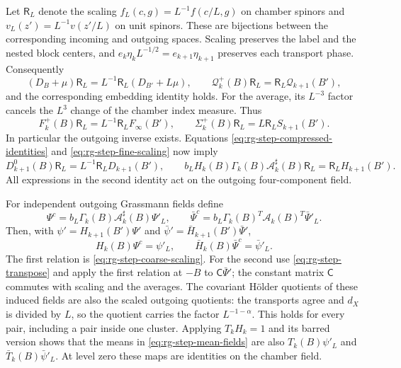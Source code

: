 Let $\mathsf R_L$ denote the scaling
$f_L(c,g)=L^{-1}f(c/L,g)$ on chamber spinors and
$v_L(z')=L^{-1}v(z'/L)$ on unit spinors.
These are bijections between the corresponding
incoming and outgoing spaces. Scaling preserves
the label and the nested block centers, and
$e_k\eta_kL^{-1/2}=e_{k+1}\eta_{k+1}$ preserves
each transport phase. Consequently
\[
 (D_B+\mu)\mathsf R_L
       =L^{-1}\mathsf R_L(D_{B'}+L\mu),\qquad
 \mathcal Q_k^+(B)\mathsf R_L
       =\mathsf R_L\mathcal Q_{k+1}(B'),
\]
and the corresponding embedding identity holds.
For the average, its $L^{-3}$ factor cancels the
$L^3$ change of the chamber index measure.
Thus
\begin{equation}\label{eq:rg-step-fine-scaling}
 F_k^+(B)\mathsf R_L
                   =L^{-1}\mathsf R_LF_\infty(B'),\qquad
 \Sigma_k^+(B)\mathsf R_L
                         =L\mathsf R_LS_{k+1}(B').
\end{equation}
In particular the outgoing inverse exists.
Equations \eqref{eq:rg-step-compressed-identities} and
\eqref{eq:rg-step-fine-scaling} now imply
\begin{equation}\label{eq:rg-step-coarse-scaling}
 D_{k+1}^0(B)\mathsf R_L
                       =L^{-1}\mathsf R_LD_{k+1}(B'),\qquad
 b_LH_k(B)\Gamma_k(B)\mathcal A_k^\sharp(B)\mathsf R_L
                       =\mathsf R_LH_{k+1}(B').
\end{equation}
All expressions in the second identity act on the
outgoing four-component field.

For independent outgoing Grassmann fields define
\begin{equation}\label{eq:rg-step-mean-fields}
 \Psi^c=b_L\Gamma_k(B)\mathcal A_k^\sharp(B)\Psi'_L,\qquad
 \bar\Psi^c=b_L\Gamma_k(B)^T\mathcal A_k(B)^T\bar\Psi'_L.
\end{equation}
Then, with $\psi'=H_{k+1}(B')\Psi'$ and
$\bar\psi'=\bar H_{k+1}(B')\bar\Psi'$,
\begin{equation}\label{eq:rg-step-induced-fields}
 H_k(B)\Psi^c=\psi'_L,\qquad
 \bar H_k(B)\bar\Psi^c=\bar\psi'_L.
\end{equation}
The first relation is \eqref{eq:rg-step-coarse-scaling}.
For the second use \eqref{eq:rg-step-transpose}
and apply the first relation at $-B$ to
$\mathsf C\bar\Psi'$; the constant matrix
$\mathsf C$ commutes with scaling and the averages.
The covariant H\"older quotients of these induced
fields are also the scaled outgoing quotients:
the transports agree and $d_X$ is divided by $L$,
so the quotient carries the factor $L^{-1-\alpha}$.
This holds for every pair, including a pair inside
one cluster.
Applying $T_kH_k=1$ and its barred version shows
that the means in \eqref{eq:rg-step-mean-fields}
are also $T_k(B)\psi'_L$ and $\bar T_k(B)\bar\psi'_L$.
At level zero these maps are identities on
the chamber field.

